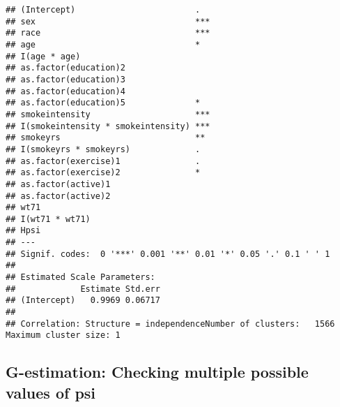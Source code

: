 \documentclass[10pt,]{book}
\begin{document}
\begin{verbatim}
## (Intercept)                        .  
## sex                                ***
## race                               ***
## age                                *  
## I(age * age)                          
## as.factor(education)2                 
## as.factor(education)3                 
## as.factor(education)4                 
## as.factor(education)5              *  
## smokeintensity                     ***
## I(smokeintensity * smokeintensity) ***
## smokeyrs                           ** 
## I(smokeyrs * smokeyrs)             .  
## as.factor(exercise)1               .  
## as.factor(exercise)2               *  
## as.factor(active)1                    
## as.factor(active)2                    
## wt71                                  
## I(wt71 * wt71)                        
## Hpsi                                  
## ---
## Signif. codes:  0 '***' 0.001 '**' 0.01 '*' 0.05 '.' 0.1 ' ' 1
## 
## Estimated Scale Parameters:
##             Estimate Std.err
## (Intercept)   0.9969 0.06717
## 
## Correlation: Structure = independenceNumber of clusters:   1566   Maximum cluster size: 1
\end{verbatim}

\hypertarget{g-estimation-checking-multiple-possible-values-of-psi}{%
\subsection{G-estimation: Checking multiple possible values of psi}\label{g-estimation-checking-multiple-possible-values-of-psi}}
\end{document}
